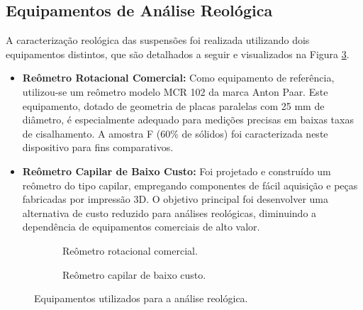 \documentclass[article,12pt,oneside,a4paper,english,brazil,sumario=tradicional]{abntex2}
\begin{document}
\subsection{Equipamentos de Análise Reológica}
A caracterização reológica das suspensões foi realizada utilizando dois equipamentos distintos, que são detalhados a seguir e visualizados na Figura \ref{fig:reometros}.
\begin{itemize}
    \item \textbf{Reômetro Rotacional Comercial:} Como equipamento de referência, utilizou-se um reômetro modelo MCR 102 da marca Anton Paar. Este equipamento, dotado de geometria de placas paralelas com 25 mm de diâmetro, é especialmente adequado para medições precisas em baixas taxas de cisalhamento. A amostra F (60\% de sólidos) foi caracterizada neste dispositivo para fins comparativos.
    \item \textbf{Reômetro Capilar de Baixo Custo:} Foi projetado e construído um reômetro do tipo capilar, empregando componentes de fácil aquisição e peças fabricadas por impressão 3D. O objetivo principal foi desenvolver uma alternativa de custo reduzido para análises reológicas, diminuindo a dependência de equipamentos comerciais de alto valor.
\end{itemize}

\begin{figure}[htbp]
  \centering
  \begin{subfigure}[b]{0.45\textwidth}
      \centering
      \caption{Reômetro rotacional comercial.}
      \label{fig:reometro_comercial}
  \end{subfigure}
  \hfill
  \begin{subfigure}[b]{0.45\textwidth}
      \centering
      \caption{Reômetro capilar de baixo custo.}
      \label{fig:reometro_diy}
  \end{subfigure}
  \caption{Equipamentos utilizados para a análise reológica.}
  \label{fig:reometros}
\end{figure}
\end{document}
